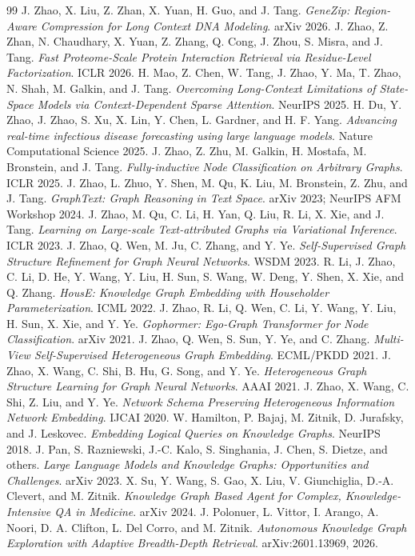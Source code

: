 \documentclass[10pt,letterpaper]{article}
\begin{document}
\clearpage
\renewcommand{\refname}{3. References}
\scriptsize
\begin{thebibliography}{99}\setlength{\itemsep}{0.16em}
 J. Zhao, X. Liu, Z. Zhan, X. Yuan, H. Guo, and J. Tang. \textit{GeneZip: Region-Aware Compression for Long Context DNA Modeling}. arXiv 2026.
 J. Zhao, Z. Zhan, N. Chaudhary, X. Yuan, Z. Zhang, Q. Cong, J. Zhou, S. Misra, and J. Tang. \textit{Fast Proteome-Scale Protein Interaction Retrieval via Residue-Level Factorization}. ICLR 2026.
 H. Mao, Z. Chen, W. Tang, J. Zhao, Y. Ma, T. Zhao, N. Shah, M. Galkin, and J. Tang. \textit{Overcoming Long-Context Limitations of State-Space Models via Context-Dependent Sparse Attention}. NeurIPS 2025.
 H. Du, Y. Zhao, J. Zhao, S. Xu, X. Lin, Y. Chen, L. Gardner, and H. F. Yang. \textit{Advancing real-time infectious disease forecasting using large language models}. Nature Computational Science 2025.
 J. Zhao, Z. Zhu, M. Galkin, H. Mostafa, M. Bronstein, and J. Tang. \textit{Fully-inductive Node Classification on Arbitrary Graphs}. ICLR 2025.
 J. Zhao, L. Zhuo, Y. Shen, M. Qu, K. Liu, M. Bronstein, Z. Zhu, and J. Tang. \textit{GraphText: Graph Reasoning in Text Space}. arXiv 2023; NeurIPS AFM Workshop 2024.
 J. Zhao, M. Qu, C. Li, H. Yan, Q. Liu, R. Li, X. Xie, and J. Tang. \textit{Learning on Large-scale Text-attributed Graphs via Variational Inference}. ICLR 2023.
 J. Zhao, Q. Wen, M. Ju, C. Zhang, and Y. Ye. \textit{Self-Supervised Graph Structure Refinement for Graph Neural Networks}. WSDM 2023.
 R. Li, J. Zhao, C. Li, D. He, Y. Wang, Y. Liu, H. Sun, S. Wang, W. Deng, Y. Shen, X. Xie, and Q. Zhang. \textit{HousE: Knowledge Graph Embedding with Householder Parameterization}. ICML 2022.
 J. Zhao, R. Li, Q. Wen, C. Li, Y. Wang, Y. Liu, H. Sun, X. Xie, and Y. Ye. \textit{Gophormer: Ego-Graph Transformer for Node Classification}. arXiv 2021.
 J. Zhao, Q. Wen, S. Sun, Y. Ye, and C. Zhang. \textit{Multi-View Self-Supervised Heterogeneous Graph Embedding}. ECML/PKDD 2021.
 J. Zhao, X. Wang, C. Shi, B. Hu, G. Song, and Y. Ye. \textit{Heterogeneous Graph Structure Learning for Graph Neural Networks}. AAAI 2021.
 J. Zhao, X. Wang, C. Shi, Z. Liu, and Y. Ye. \textit{Network Schema Preserving Heterogeneous Information Network Embedding}. IJCAI 2020.
 W. Hamilton, P. Bajaj, M. Zitnik, D. Jurafsky, and J. Leskovec. \textit{Embedding Logical Queries on Knowledge Graphs}. NeurIPS 2018.
 J. Pan, S. Razniewski, J.-C. Kalo, S. Singhania, J. Chen, S. Dietze, and others. \textit{Large Language Models and Knowledge Graphs: Opportunities and Challenges}. arXiv 2023.
 X. Su, Y. Wang, S. Gao, X. Liu, V. Giunchiglia, D.-A. Clevert, and M. Zitnik. \textit{Knowledge Graph Based Agent for Complex, Knowledge-Intensive QA in Medicine}. arXiv 2024.
 J. Polonuer, L. Vittor, I. Arango, A. Noori, D. A. Clifton, L. Del Corro, and M. Zitnik. \textit{Autonomous Knowledge Graph Exploration with Adaptive Breadth-Depth Retrieval}. arXiv:2601.13969, 2026.
\end{thebibliography}
\end{document}
